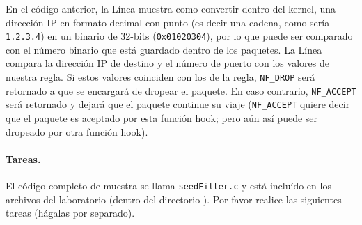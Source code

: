 En el código anterior, la Línea  muestra como convertir dentro del kernel, una dirección IP en formato decimal con punto (es decir una cadena, como sería \texttt{1.2.3.4}) en un binario de 32-bits (\texttt{0x01020304}), por lo que puede ser comparado con el número binario que está guardado dentro de los paquetes.
La Línea  compara la dirección IP de destino y el número de puerto con los valores de nuestra regla. Si estos valores coinciden con los de la regla,  \texttt{NF\_DROP} será retornado a \netfilter que se encargará de dropear el paquete. En caso contrario, \texttt{NF\_ACCEPT} será retornado y \netfilter dejará que el paquete continue su viaje (\texttt{NF\_ACCEPT} quiere decir que el paquete es aceptado por esta función hook; pero aún así puede ser dropeado por otra función hook).

\paragraph{Tareas.} El código completo de muestra se llama \texttt{seedFilter.c} y está incluído en los archivos del laboratorio (dentro del directorio ). Por favor realice las siguientes tareas (hágalas por separado).

